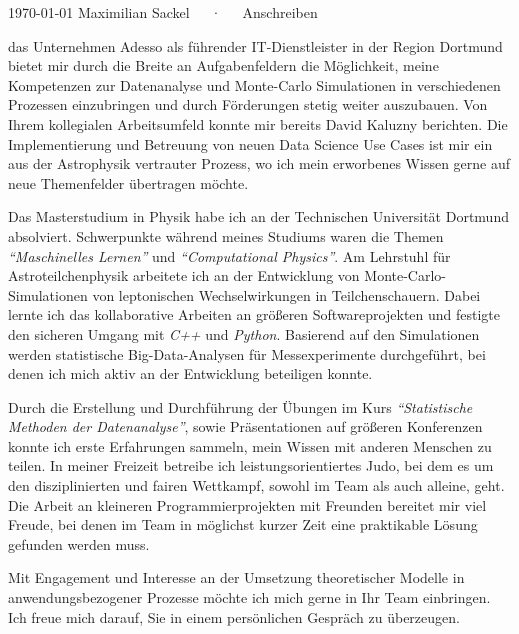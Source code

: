 \documentclass[11pt, a4paper]{Awesome-CV/awesome-cv}
\begin{document}
\makecvheader[R]

\makecvfooter
{\today}
{Maximilian Sackel~~~·~~~Anschreiben}
{}

\makelettertitle

\begin{cvletter}
    das Unternehmen Adesso als führender IT-Dienstleister in der Region Dortmund
    bietet mir durch die Breite an Aufgabenfeldern die Möglichkeit, meine
    Kompetenzen zur Datenanalyse und Monte-Carlo Simulationen in verschiedenen Prozessen einzubringen und durch Förderungen stetig weiter auszubauen.
    Von Ihrem kollegialen Arbeitsumfeld konnte mir bereits David Kaluzny berichten.
    Die Implementierung und Betreuung von neuen Data Science Use Cases ist mir ein aus der Astrophysik vertrauter Prozess, wo ich mein erworbenes Wissen gerne auf neue Themenfelder übertragen möchte.

    Das Masterstudium in Physik habe ich an der Technischen Universität Dortmund absolviert.
    Schwerpunkte während meines Studiums waren die Themen \textit{``Maschinelles Lernen''} und \textit{``Computational Physics''}.
    Am Lehrstuhl für Astroteilchenphysik arbeitete ich an der Entwicklung von Monte-Carlo-Simulationen von leptonischen Wechselwirkungen in Teilchenschauern.
    Dabei lernte ich das kollaborative Arbeiten an größeren Softwareprojekten und festigte den sicheren Umgang mit \textit{C++} und \textit{Python}.
    Basierend auf den Simulationen werden statistische Big-Data-Analysen für Messexperimente durchgeführt, bei denen ich mich aktiv an der Entwicklung beteiligen konnte.

    Durch die Erstellung und Durchführung der Übungen im Kurs
    \textit{``Statistische Methoden der Datenanalyse''}, sowie Präsentationen
    auf größeren Konferenzen konnte ich erste Erfahrungen sammeln, mein Wissen mit anderen Menschen zu teilen.
    In meiner Freizeit betreibe ich leistungsorientiertes Judo, bei dem es um
    den disziplinierten und fairen Wettkampf, sowohl im Team als auch alleine, geht.
    Die Arbeit an kleineren Programmierprojekten mit Freunden bereitet mir viel Freude, bei denen im Team in möglichst kurzer Zeit eine praktikable Lösung gefunden werden muss.

    Mit Engagement und Interesse an der Umsetzung theoretischer Modelle in anwendungsbezogener Prozesse möchte ich mich gerne in Ihr Team einbringen.
    Ich freue mich darauf, Sie in einem persönlichen Gespräch zu überzeugen.

\end{cvletter}


\makeletterclosing
\end{document}
